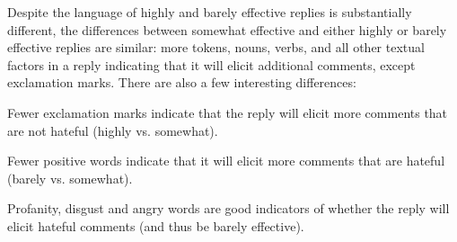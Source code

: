 \documentclass[11pt]{article}
\begin{document}
Despite the language of highly and barely effective replies is substantially different,
the differences between somewhat effective and either highly or barely effective replies are similar:
more tokens, nouns, verbs, and all other textual factors in a reply indicating that it will elicit additional comments, except exclamation marks. 
There are also a few interesting differences:
\begin{compactitem}
	\item Fewer exclamation marks indicate that the reply will elicit more comments that are not hateful (highly vs. somewhat).
	\item Fewer positive words indicate that it will elicit more comments that are hateful (barely vs. somewhat).
	\item Profanity, disgust and angry words are good indicators of whether the reply will elicit hateful comments (and thus be barely effective).
\end{compactitem}

\begin{comment}
The second (Most vs. Neutral) and third (Least vs. Neutral) pairwise comparisons in Table \ref{t:linguistic-analysis} present the factors that differs between Neutral and the other two groups. 
Compared with Neutral, More has less profanity words and exclamation marks, while Least has more profanity and angry words. 
Surprisingly, though Most and Least differ in a lot of factors, they share similar characteristics when comparing to Neutral.  
We notice a few factors that attract more \emph{Futures} following the \emph{Reply}:
\begin{compactitem}
\item Having more tokens, nouns and verbs. \emph{Reply}s written in more words are more inclined to captivate comments. 
\item Using question marks. \emph{Reply}s using question marks are easier to have comments to follow.
\item Using 1st person pronouns express people's own opinions and 2nd person pronouns targeting others. 
\item Using overstated words indicating emphasis in certainty, such as absolute. 
\end{compactitem}
\end{comment}
\end{document}
